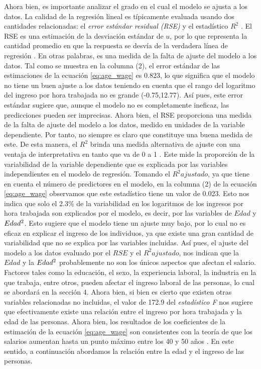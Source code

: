 \documentclass[12pt,a4paper,onecolumn]{article}
\begin{document}
Ahora bien, es importante analizar el grado en el cual el modelo se ajusta a los datos. La calidad de la regresión lineal es típicamente evaluada usando dos cantidades relacionadas: el \textit{error estándar residual (RSE)} y el estadístico \( R^2 \) \citep{james2013}. 
\bigbreak
El RSE es una estimación de la desviación estándar de $u$, por lo que representa la cantidad promedio en que la respuesta se desvía de la verdadera línea de regresión \citep{james2013}. En otras palabras, es una medida de la falta de ajuste del modelo a los datos. Tal como se muestra en la columna (2), el error estándar de las estimaciones de la ecuación \ref{eq:age_wage} es 0.823, lo que significa que el modelo no tiene un buen ajuste a los datos teniendo en cuenta que el rango  del logaritmo del ingreso por hora trabajada no es grande (-0.75,12.77). Así pues, este error estándar sugiere que, aunque el modelo no es completamente ineficaz, las predicciones pueden ser imprecisas.
\bigbreak
Ahora bien, el RSE proporciona una medida de la falta de ajuste del modelo a los datos, medido en unidades de la variable dependiente. Por tanto, no siempre es claro que constituye una buena medida de este. De esta manera, el \( R^2 \) brinda una medida alternativa de ajuste con una ventaja de interpretativa en tanto que va de 0 a 1 \citep{james2013}. Este mide la proporción de la variabilidad de la variable dependiente que es explicada por las variables independientes en el modelo de regresión.
\bigbreak
Tomando el \( R^2 ajustado \), ya que tiene en cuenta el número de predictores en el modelo, en la columna (2) de la ecuación \ref{eq:age_wage} observamos que este estadístico tiene un valor de 0.023. Esto nos indica que solo el 2.3\% de la variabilidad en los logaritmos de los ingresos por hora trabajada son explicados por el modelo, es decir, por las variables de $Edad$ y $Edad\textsuperscript{2}$. Esto sugiere que el modelo tiene un ajuste muy bajo, por lo cual no es eficaz en explicar el ingreso de los individuos, ya que existe una gran cantidad de variabilidad que no se explica por las variables incluidas. 
\bigbreak
Así pues, el ajuste del modelo a los datos evaluado por el $RSE$ y el  \( R^2 ajustado \), nos indican que la $Edad$ y la $Edad\textsuperscript{2}$ probablemente no son los únicos aspectos que afectan el salario. Factores tales como la educación, el sexo, la experiencia laboral, la industria en la que trabaja, entre otros, pueden afectar el ingreso laboral de las personas, lo cual se abordará en la sección 4. Ahora bien, si bien es cierto que existen otras variables relacionadas no incluidas, el valor de 172.9 del \textit{estadístico F} nos sugiere que efectivamente existe una relación entre el ingreso por hora trabajada y la edad de las personas.
\bigbreak
Ahora bien, los resultados de los coeficientes de la estimación de la ecuación \ref{eq:age_wage} son consistentes con la teoría de que los salarios aumentan hasta un punto máximo entre los 40 y 50 años \citep{mincer1974}. En este sentido, a continuación abordamos la relación entre la edad y el ingreso de las personas.
\end{document}
